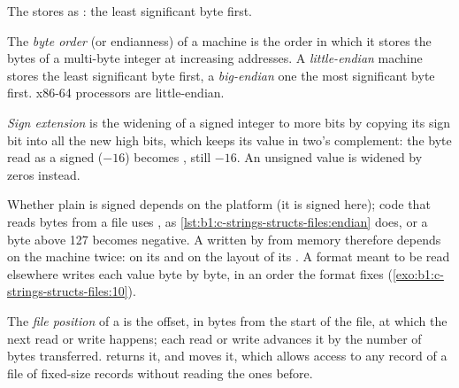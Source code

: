 The  stores  as : the least significant byte first.

\begin{definition}\label{def:b1:c-strings-structs-files:byte-order}
The \emph{byte order} (or endianness) of a machine is the order in which it stores the bytes of a
multi-byte integer at increasing addresses. A \emph{little-endian} machine stores the least
significant byte first, a \emph{big-endian} one the most significant byte first. x86-64 processors
are little-endian.
\end{definition}

\label{lst:b1:c-strings-structs-files:endian}

\label{out:b1:c-strings-structs-files:endian}

\begin{definition}\label{def:b1:c-strings-structs-files:sign-extension}
\emph{Sign extension} is the widening of a signed integer to more bits by copying its sign bit
into all the new high bits, which keeps its value in two's complement: the byte  read as a signed
 ($-16$) becomes , still $-16$. An unsigned value is widened by zeros instead.
\end{definition}

Whether plain  is signed depends on the platform (it is signed here); code that reads bytes from a file
uses , as \cref{lst:b1:c-strings-structs-files:endian} does, or a byte above 127 becomes negative.
A  written by  from memory therefore depends on the machine twice: on its  and on
the layout of its . A format meant to be read elsewhere writes each value byte by byte, in an order the
format fixes (\cref{exo:b1:c-strings-structs-files:10}).

\begin{definition}\label{def:b1:c-strings-structs-files:position}
The \emph{file position} of a  is the offset, in bytes from the start of the file, at which
the next read or write happens; each read or write advances it by the number of bytes transferred. 
returns it, and  moves it, which allows access to any record of a file of fixed-size records without
reading the ones before.
\end{definition}

